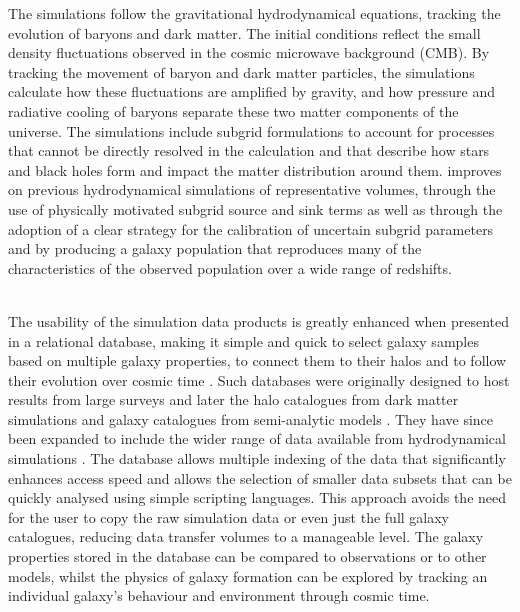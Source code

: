 The simulations follow the gravitational hydrodynamical equations, tracking the
evolution of baryons and dark matter. The initial conditions reflect the small
density fluctuations observed in the cosmic microwave background (CMB). By
tracking the movement of baryon and dark matter particles, the simulations
calculate how these fluctuations are amplified by gravity, and how pressure and
radiative cooling of baryons separate these two matter components of the
universe. The simulations include subgrid formulations to account for processes
that cannot be directly resolved in the calculation and that describe how stars
and black holes form and impact the matter distribution around them. \eagle
improves on previous hydrodynamical simulations of representative volumes,
through the use of physically motivated subgrid source and sink terms as well as
through the adoption of a clear strategy for the calibration of uncertain
subgrid parameters \citep{Crain2015} and by producing a galaxy population that
reproduces many of the characteristics of the observed population over a wide
range of redshifts.

~\\

The usability of the simulation data products is greatly enhanced when presented
in a relational database, making it simple and quick to select galaxy samples
based on multiple galaxy properties, to connect them to their halos and to
follow their evolution over cosmic time \citep{Lemson2006a}.  Such databases
were originally designed to host results from large surveys \citep[e.g. the SDSS
  SkyServer][]{Szalay2000} and later the halo catalogues from dark matter
simulations and galaxy catalogues from semi-analytic models \citep[applied to
  the \emph{Millennium Simulation}, see][]{Lemson2006b}. They have since been
expanded to include the wider range of data available from hydrodynamical
simulations \citep[e.g.][]{Dolag2009,Khandai2015,Nelson2015}. The database
allows multiple indexing of the data that significantly enhances access speed
and allows the selection of smaller data subsets that can be quickly analysed
using simple scripting languages. This approach avoids the need for the user to
copy the raw simulation data or even just the full galaxy catalogues, reducing
data transfer volumes to a manageable level. The galaxy properties stored in the
database can be compared to observations or to other models, whilst the physics
of galaxy formation can be explored by tracking an individual galaxy's behaviour
and environment through cosmic time.

